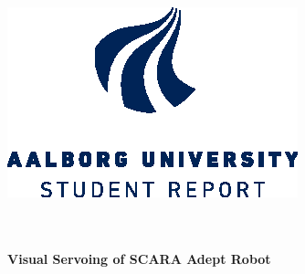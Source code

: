 \begin{titlepage}

\enlargethispage{10\baselineskip}



\center %
 

\begin{minipage}[t]{\textwidth}
\begin{flushright}
  
\includegraphics[scale=1]{./forside/84800_aau_uk_studentreport_blue_cmyk}
\end{flushright}

\end{minipage}\\[1cm]
\HRule \\[0.4cm]
{ \huge \bfseries Visual Servoing of SCARA Adept Robot}\\[0.2cm] %
\HRule \\[.4cm]


\end{titlepage}
